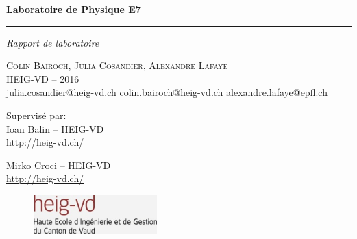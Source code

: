 \documentclass[a4paper,french,twoside,13pt]{report}
\newcommand{\titleinfo}{Laboratoire de Physique E7 }
\begin{document}
\begin{titlepage}
    \null\vfil
    \begin{flushleft}
	\begin{center}
	    \Huge \textbf{\titleinfo}
	\end{center}
    \end{flushleft}
    \par
    \hrule height 4pt
    \par
    \begin{flushright}
	\large
	\textsl{Rapport de laboratoire} \par
    \end{flushright}
    \vspace{\fill}

    \begin{center}
	\Large
	\textsc{Colin Bairoch, Julia Cosandier, Alexandre Lafaye\\
	HEIG-VD -- 2016} \\
	\href{mailto:julia.cosandier@heig-vd.ch}{julia.cosandier@heig-vd.ch}
	\href{mailto:colin.bairoch@heig-vd.ch}{colin.bairoch@heig-vd.ch}
	\href{mailto:alexandre.lafaye@epfl.ch}{alexandre.lafaye@epfl.ch}
    \end{center}
    \vspace{\fill}
    \begin{center}
	\large
	Supervisé par: \\
	\vspace{\fill}
	Ioan Balin -- HEIG-VD\\
	\href{http://heig-vd.ch/}{http://heig-vd.ch/} \\
    \end{center}
    \begin{center}
	\large
	Mirko Croci -- HEIG-VD \\
	\href{http://heig-vd.ch/}{http://heig-vd.ch/} \\
    \end{center}

    \vspace{\fill}

    \begin{figure}[!h]
	\centering
	\parbox{1.4in}{
	\includegraphics[height=4em]{logo_heig_h80.jpg}}
    \end{figure}

    \vspace*{1cm}
\end{titlepage}
\end{document}
